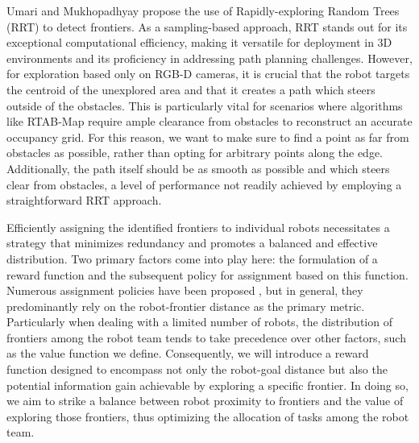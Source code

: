 Umari and Mukhopadhyay \cite{rrt_exploration} propose the use of Rapidly-exploring Random Trees (RRT) to detect frontiers. As a sampling-based approach, RRT stands out for its exceptional computational efficiency, making it versatile for deployment in 3D environments and its proficiency in addressing path planning challenges. However, for exploration based only on RGB-D cameras, it is crucial that the robot targets the centroid of the unexplored area and that it creates a path which steers outside of the obstacles. This is particularly vital for scenarios where algorithms like RTAB-Map require ample clearance from obstacles to reconstruct an accurate occupancy grid. For this reason, we want to make sure to find a point as far from obstacles as possible, rather than opting for arbitrary points along the edge. Additionally, the path itself should be as smooth as possible and which steers clear from obstacles, a level of performance not readily achieved by employing a straightforward RRT approach.

Efficiently assigning the identified frontiers to individual robots necessitates a strategy that minimizes redundancy and promotes a balanced and effective distribution. Two primary factors come into play here: the formulation of a reward function and the subsequent policy for assignment based on this function. Numerous assignment policies have been proposed \cite{allocation}, but in general, they predominantly rely on the robot-frontier distance as the primary metric. Particularly when dealing with a limited number of robots, the distribution of frontiers among the robot team tends to take precedence over other factors, such as the value function we define.
Consequently, we will introduce a reward function designed to encompass not only the robot-goal distance but also the potential information gain achievable by exploring a specific frontier. In doing so, we aim to strike a balance between robot proximity to frontiers and the value of exploring those frontiers, thus optimizing the allocation of tasks among the robot team.

    
